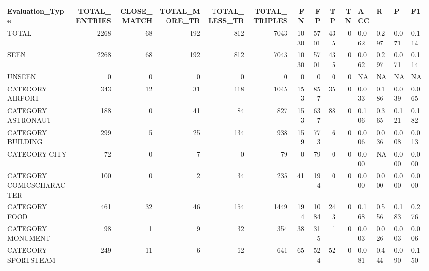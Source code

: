 \begin{tabular}{lrrrrrrrrrllll}
\hline
 Evaluation\_Type          &   TOTAL\_ENTRIES &   CLOSE\_MATCH &   TOTAL\_MORE\_TR &   TOTAL\_LESS\_TR &   TOTAL\_TRIPLES &   FN &   FP &   TP &   TN & ACC   & R     & P     & F1    \\
\hline
 TOTAL                    &            2268 &            68 &             192 &             812 &            7043 & 1030 & 5701 &  435 &    0 & 0.062 & 0.297 & 0.071 & 0.114 \\
 SEEN                     &            2268 &            68 &             192 &             812 &            7043 & 1030 & 5701 &  435 &    0 & 0.062 & 0.297 & 0.071 & 0.114 \\
 UNSEEN                   &               0 &             0 &               0 &               0 &               0 &    0 &    0 &    0 &    0 & NA    & NA    & NA    & NA    \\
 CATEGORY AIRPORT         &             343 &            12 &              31 &             118 &            1045 &  153 &  857 &   35 &    0 & 0.033 & 0.186 & 0.039 & 0.065 \\
 CATEGORY ASTRONAUT       &             188 &             0 &              41 &              84 &             827 &  153 &  637 &   88 &    0 & 0.106 & 0.365 & 0.121 & 0.182 \\
 CATEGORY BUILDING        &             299 &             5 &              25 &             134 &             938 &  159 &  773 &    6 &    0 & 0.006 & 0.036 & 0.008 & 0.013 \\
 CATEGORY CITY            &              72 &             0 &               7 &               0 &              79 &    0 &   79 &    0 &    0 & 0.000 & NA    & 0.000 & 0.000 \\
 CATEGORY COMICSCHARACTER &             100 &             0 &               2 &              34 &             235 &   41 &  194 &    0 &    0 & 0.000 & 0.000 & 0.000 & 0.000 \\
 CATEGORY FOOD            &             461 &            32 &              46 &             164 &            1449 &  194 & 1084 &  243 &    0 & 0.168 & 0.556 & 0.183 & 0.276 \\
 CATEGORY MONUMENT        &              98 &             1 &               9 &              32 &             354 &   38 &  315 &    1 &    0 & 0.003 & 0.026 & 0.003 & 0.006 \\
 CATEGORY SPORTSTEAM      &             249 &            11 &               6 &              62 &             641 &   65 &  524 &   52 &    0 & 0.081 & 0.444 & 0.090 & 0.150 \\

\end{tabular}

